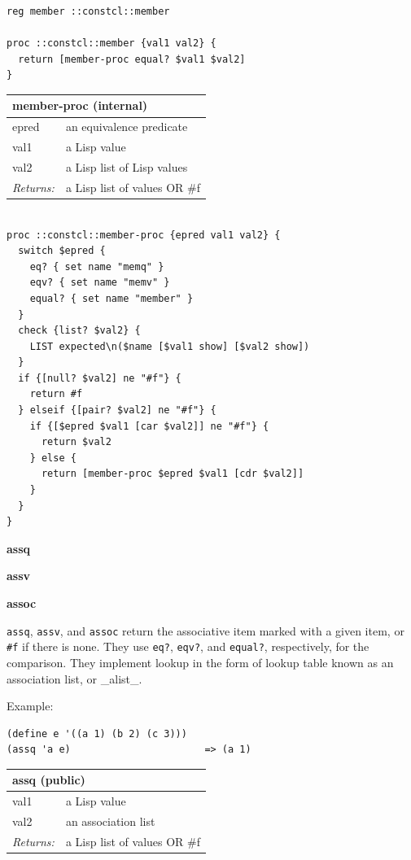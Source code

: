 \documentclass[twoside,9pt]{report}
\begin{document}
\noindent\makebox[\linewidth]{\rule{\linewidth}{0.4pt}}
\begin{lstlisting}
reg member ::constcl::member
 
proc ::constcl::member {val1 val2} {
  return [member-proc equal? $val1 $val2]
}
\end{lstlisting}
\noindent\makebox[\linewidth]{\rule{\linewidth}{0.4pt}}
\begin{tabular}{ |l l| }
\hline
\multicolumn{2}{|l|}{member-proc (internal)} \\
\hline
epred & an equivalence predicate \\
val1 & a Lisp value \\
val2 & a Lisp list of Lisp values \\
\textit{Returns:} & a Lisp list of values OR \#f \\
\hline
\end{tabular}

\noindent\makebox[\linewidth]{\rule{\linewidth}{0.4pt}}
\begin{lstlisting}
 
proc ::constcl::member-proc {epred val1 val2} {
  switch $epred {
    eq? { set name "memq" }
    eqv? { set name "memv" }
    equal? { set name "member" }
  }
  check {list? $val2} {
    LIST expected\n($name [$val1 show] [$val2 show])
  }
  if {[null? $val2] ne "#f"} {
    return #f
  } elseif {[pair? $val2] ne "#f"} {
    if {[$epred $val1 [car $val2]] ne "#f"} {
      return $val2
    } else {
      return [member-proc $epred $val1 [cdr $val2]]
    }
  }
}
\end{lstlisting}
\noindent\makebox[\linewidth]{\rule{\linewidth}{0.4pt}}

\textbf{assq}


\textbf{assv}


\textbf{assoc}


\texttt{assq}, \texttt{assv}, and \texttt{assoc} return the associative item marked with a given item, or \texttt{\#f} if there is none. They use \texttt{eq?}, \texttt{eqv?}, and \texttt{equal?}, respectively, for the comparison. They implement lookup in the form of lookup table known as an association list, or \_alist\_.


Example:

\noindent\makebox[\linewidth]{\rule{\linewidth}{0.4pt}}
\begin{lstlisting}
(define e '((a 1) (b 2) (c 3)))
(assq 'a e)                       => (a 1)
\end{lstlisting}
\noindent\makebox[\linewidth]{\rule{\linewidth}{0.4pt}}
\begin{tabular}{ |l l| }
\hline
\multicolumn{2}{|l|}{assq (public)} \\
\hline
val1 & a Lisp value \\
val2 & an association list \\
\textit{Returns:} & a Lisp list of values OR \#f \\
\hline
\end{tabular}
\end{document}
